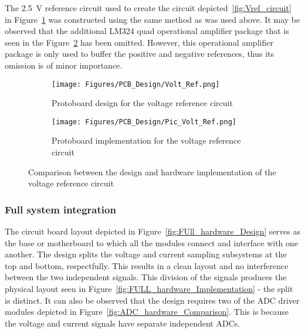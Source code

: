 The \qty{2.5}{\volt} reference circuit used to create the circuit depicted~\ref{fig:Vref_circuit} in Figure~\ref{fig:REF_hardware_Design} was constructed using the same method as was used above. 
It may be observed that the additional LM324 quad operational amplifier package that is seen in the Figure~\ref{fig:REF_hardware_Implementation} has been omitted. However, this operational amplifier package is only used to buffer the positive and negative references, thus its omission is of minor importance.  
\begin{figure}[H]
     \centering
     \begin{subfigure}[b]{0.495\textwidth}
        \centering
        \texttt{[image: Figures/PCB\_Design/Volt\_Ref.png]}
         \caption{Protoboard design for the voltage reference circuit}
        \label{fig:REF_hardware_Design}
     \end{subfigure}
     \hfill
     \begin{subfigure}[b]{0.495\textwidth}
        \centering
        \texttt{[image: Figures/PCB\_Design/Pic\_Volt\_Ref.png]}
        \caption{Protoboard implementation for the voltage reference circuit}
        \label{fig:REF_hardware_Implementation}
     \end{subfigure}
        \caption{Comparison between the design and hardware implementation of the voltage reference circuit}
        \label{fig:REF_hardware_Comparison}
\end{figure}

\subsubsection{Full system integration}

The circuit board layout depicted in Figure~\ref{fig:FUll_hardware_Design} serves as the base or motherboard to which all the modules connect and interface with one another. The design splits the voltage and current sampling subsystems at the top and bottom, respectfully. This results in a clean layout and no interference between the two independent signals. This division of the signals produces the physical layout seen in Figure~\ref{fig:FULL_hardware_Implementation} - the split is distinct. It can also be observed that the design requires two of the ADC driver modules depicted in Figure~\ref{fig:ADC_hardware_Comparison}. This is because the voltage and current signals have separate independent ADCs.

